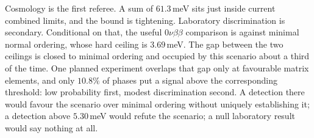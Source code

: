 \documentclass[aps,prd,twocolumn,superscriptaddress,nofootinbib,10pt]{revtex4-2}
\begin{document}
Cosmology is the first referee. A sum of $61.3\,$meV sits just inside current combined limits, and
the bound is tightening. Laboratory discrimination is secondary. Conditional on that, the useful
$0\nu\beta\beta$ comparison is against minimal normal ordering, whose hard ceiling is $3.69\,$meV.
The gap between the two ceilings is closed to minimal ordering and occupied by this scenario about
a third of the time. One planned experiment overlaps that gap only at favourable matrix elements,
and only $10.8\%$ of phases put a signal above the corresponding threshold: low probability first,
modest discrimination second. A detection there would favour the scenario over minimal ordering
without uniquely establishing it; a detection above $5.30\,$meV would refute the scenario; a null
laboratory result would say nothing at all.



\end{document}
